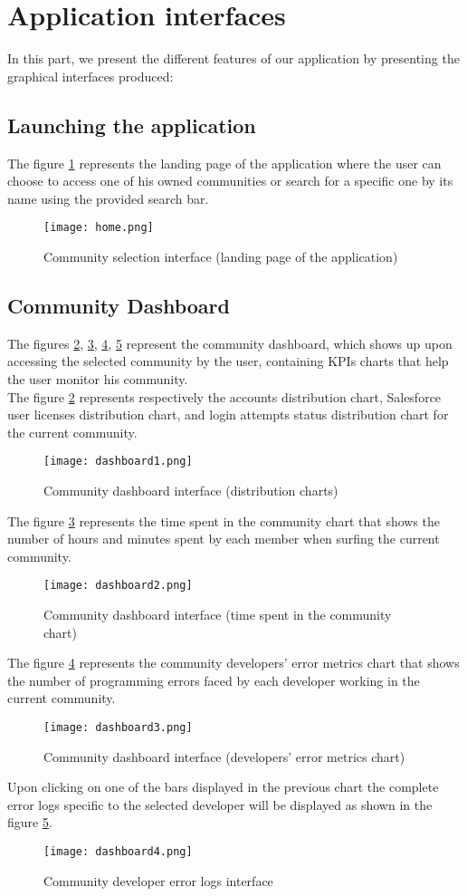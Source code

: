 \section{Application interfaces}
In this part, we present the different features of our
application by presenting the graphical interfaces produced:
\subsection{Launching the application}
The figure \ref{landing} represents the landing page of the application where the user can choose to access one of his owned communities or search for a specific one by its name using the provided search bar.
\begin{figure}[H]%
    \center   
    \texttt{[image: home.png]}
    \caption{Community selection interface (landing page of the application)}
    \label{landing}
\end{figure}
\subsection{Community Dashboard}
The figures \ref{dashboard1}, \ref{dashboard2}, \ref{dashboard3}, \ref{dashboard4} represent the community dashboard, which shows up upon accessing the selected community by the user, containing KPIs charts that help the user monitor his community.\\
The figure \ref{dashboard1} represents respectively the accounts distribution chart, Salesforce user licenses distribution chart, and login attempts status distribution chart for the current community.
\begin{figure}[H]%
    \center   
    \texttt{[image: dashboard1.png]}
    \caption{Community dashboard interface (distribution charts)}
    \label{dashboard1}
\end{figure}
The figure \ref{dashboard2} represents the time spent in the community chart that shows the number of hours and minutes spent by each member when surfing the current community.
\begin{figure}[H]%
    \center   
    \texttt{[image: dashboard2.png]}
    \caption{Community dashboard interface (time spent in the community chart)}
    \label{dashboard2}
\end{figure}
The figure \ref{dashboard3} represents the community developers' error metrics chart that shows the number of programming errors faced by each developer working in the current community.
\begin{figure}[H]%
    \center   
    \texttt{[image: dashboard3.png]}
    \caption{Community dashboard interface (developers' error metrics chart)}
    \label{dashboard3}
\end{figure}
Upon clicking on one of the bars displayed in the previous chart the complete error logs specific to the selected developer will be displayed as shown in the figure \ref{dashboard4}.
\begin{figure}[H]%
    \center   
    \texttt{[image: dashboard4.png]}
    \caption{Community developer error logs interface}
    \label{dashboard4}
\end{figure}
